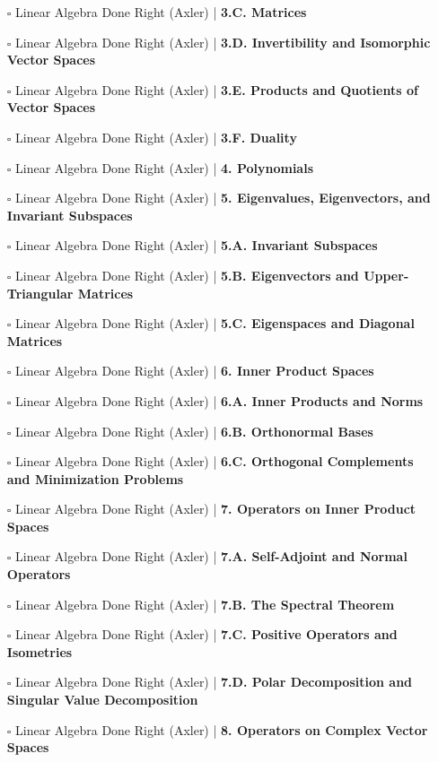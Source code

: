 \documentclass[a4, landscape, 12pt]{article}
\newcommand{\checkbox}{$\square$}%
\begin{document}
\begin{itemize}
{}
\item [\checkbox] Linear Algebra Done Right (Axler)  | \textbf{3.C. Matrices
}
\item [\checkbox] Linear Algebra Done Right (Axler)  | \textbf{3.D. Invertibility and Isomorphic Vector Spaces
}
\item [\checkbox] Linear Algebra Done Right (Axler)  | \textbf{3.E. Products and Quotients of Vector Spaces
}
\item [\checkbox] Linear Algebra Done Right (Axler)  | \textbf{3.F. Duality
}
\item [\checkbox] Linear Algebra Done Right (Axler)  | \textbf{4. Polynomials
}
\item [\checkbox] Linear Algebra Done Right (Axler)  | \textbf{5. Eigenvalues, Eigenvectors, and Invariant Subspaces
}
\item [\checkbox] Linear Algebra Done Right (Axler)  | \textbf{5.A. Invariant Subspaces
}
\item [\checkbox] Linear Algebra Done Right (Axler)  | \textbf{5.B. Eigenvectors and Upper-Triangular Matrices
}
\item [\checkbox] Linear Algebra Done Right (Axler)  | \textbf{5.C. Eigenspaces and Diagonal Matrices
}
\item [\checkbox] Linear Algebra Done Right (Axler)  | \textbf{6. Inner Product Spaces
}
\item [\checkbox] Linear Algebra Done Right (Axler)  | \textbf{6.A. Inner Products and Norms
}
\item [\checkbox] Linear Algebra Done Right (Axler)  | \textbf{6.B. Orthonormal Bases
}
\item [\checkbox] Linear Algebra Done Right (Axler)  | \textbf{6.C. Orthogonal Complements and Minimization Problems
}
\item [\checkbox] Linear Algebra Done Right (Axler)  | \textbf{7. Operators on Inner Product Spaces
}
\item [\checkbox] Linear Algebra Done Right (Axler)  | \textbf{7.A. Self-Adjoint and Normal Operators
}
\item [\checkbox] Linear Algebra Done Right (Axler)  | \textbf{7.B. The Spectral Theorem
}
\item [\checkbox] Linear Algebra Done Right (Axler)  | \textbf{7.C. Positive Operators and Isometries
}
\item [\checkbox] Linear Algebra Done Right (Axler)  | \textbf{7.D. Polar Decomposition and Singular Value Decomposition
}
\item [\checkbox] Linear Algebra Done Right (Axler)  | \textbf{8. Operators on Complex Vector Spaces
}
\end{itemize}
\end{document}
